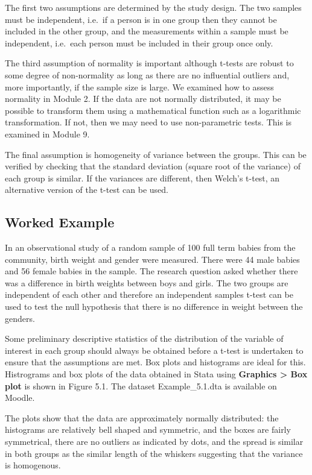 \documentclass[
]{memoir}
\begin{document}
The first two assumptions are determined by the study design. The two samples must be independent, i.e.~if a person is in one group then they cannot be included in the other group, and the measurements within a sample must be independent, i.e.~each person must be included in their group once only.

The third assumption of normality is important although t-tests are robust to some degree of non-normality as long as there are no influential outliers and, more importantly, if the sample size is large. We examined how to assess normality in Module 2. If the data are not normally distributed, it may be possible to transform them using a mathematical function such as a logarithmic transformation. If not, then we may need to use non-parametric tests. This is examined in Module 9.

The final assumption is homogeneity of variance between the groups. This can be verified by checking that the standard deviation (square root of the variance) of each group is similar. If the variances are different, then Welch's t-test, an alternative version of the t-test can be used.

\hypertarget{worked-example-5}{%
\subsection{Worked Example}\label{worked-example-5}}

In an observational study of a random sample of 100 full term babies from the community, birth weight and gender were measured. There were 44 male babies and 56 female babies in the sample. The research question asked whether there was a difference in birth weights between boys and girls. The two groups are independent of each other and therefore an independent samples t-test can be used to test the null hypothesis that there is no difference in weight between the genders.

Some preliminary descriptive statistics of the distribution of the variable of interest in each group should always be obtained before a t-test is undertaken to ensure that the assumptions are met. Box plots and histograms are ideal for this. Histrograms and box plots of the data obtained in Stata using \textbf{Graphics \textgreater{} Box plot} is shown in Figure 5.1. The dataset Example\_5.1.dta is available on Moodle.

The plots show that the data are approximately normally distributed: the histograms are relatively bell shaped and symmetric, and the boxes are fairly symmetrical, there are no outliers as indicated by dots, and the spread is similar in both groups as the similar length of the whiskers suggesting that the variance is homogenous.
\end{document}

